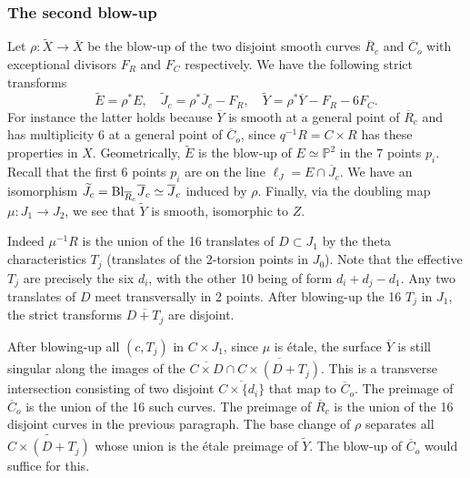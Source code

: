 \documentclass[12pt]{amsart}
\theoremstyle{definition}
\newcommand{\bb}{\ensuremath{\mathfrak{b}}}
\newcommand{\?}{ \circled{{\large\bf ?}}}
\let\bb\mathbb
\begin{document}
\subsubsection{The second blow-up}
Let $\rho:\widetilde X\to\overline X$ be the blow-up of the two disjoint smooth curves $\overline R_c$ and $\overline C_o$ with exceptional divisors $F_R$ and $F_C$ respectively. We have the following strict transforms
\[\widetilde E=\rho^*E,\quad \widetilde J_c=\rho^*\overline J_c-F_R,\quad \widetilde Y=\rho^*\overline Y-F_R-6F_C.\]
For instance the latter holds because $\overline Y$ is smooth at a general point of $\overline R_c$ and has multiplicity 6 at a general point of $\overline C_o$, since $q^{-1}R=C\times R$ has these properties in $X$. 
Geometrically, $\widetilde E$ is the blow-up of $E\simeq\bb P^2$ in the $7$ points $p_i$. Recall that the first 6 points $p_i$ are on the line $\ell_J=E\cap\overline J_c$. We have an isomorphism $\widetilde J_c={\rm Bl}_{\overline R_c}\overline J_c\simeq\overline J_c$ induced by $\rho$. Finally, via the doubling map $\mu:J_1\to J_2$, we see that $\widetilde Y$ is smooth, isomorphic to $Z$.

Indeed $\mu^{-1}R$ is the union of the 16 translates of $D\subset J_1$ by the theta characteristics $T_j$ (translates of the 2-torsion points in $J_0$). Note that the effective $T_j$ are precisely the six $d_i$, with the other 10 being of form $d_i+d_j-d_1$. Any two translates of $D$ meet transversally in 2 points. After blowing-up the 16 $T_j$ in $J_1$, the strict transforms $\overline{D+T_j}$ are disjoint. 

After blowing-up all $(c,T_j)$ in $C\times J_1$, since $\mu$ is \' etale, the surface $\overline Y$ is still singular along the images of the $\overline{C\times D}\cap\overline{C\times(D+T_j)}$. This is a transverse intersection consisting of two disjoint $\overline{C\times\{d_i\}}$ that map to $\overline C_o$. The preimage of $\overline C_o$ is the union of the 16 such curves. The preimage of $\overline R_c$ is the union of the 16 disjoint curves in the previous paragraph. The base change of $\rho$ separates all $\widetilde{C\times (D+T_j)}$ whose union is the \' etale preimage of $\widetilde Y$. The blow-up of $\overline C_o$ would suffice for this.
\end{document}

